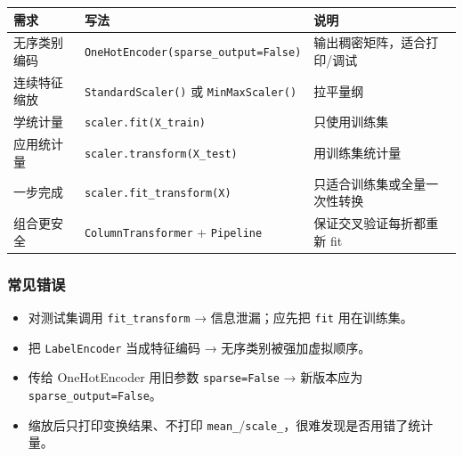 {\def\LTcaptype{none} %
\begin{longtable}[]{@{}
  >{\raggedright\arraybackslash}p{}
  >{\raggedright\arraybackslash}p{}
  >{\raggedright\arraybackslash}p{}@{}}
\toprule\noalign{}
\begin{minipage}[b]{\linewidth}\raggedright
需求
\end{minipage} & \begin{minipage}[b]{\linewidth}\raggedright
写法
\end{minipage} & \begin{minipage}[b]{\linewidth}\raggedright
说明
\end{minipage} \\
\midrule\noalign{}
\endhead
\bottomrule\noalign{}
\endlastfoot
无序类别编码 & \texttt{OneHotEncoder(sparse\_output=False)} &
输出稠密矩阵，适合打印/调试 \\
连续特征缩放 & \texttt{StandardScaler()} 或 \texttt{MinMaxScaler()} &
拉平量纲 \\
学统计量 & \texttt{scaler.fit(X\_train)} & 只使用训练集 \\
应用统计量 & \texttt{scaler.transform(X\_test)} & 用训练集统计量 \\
一步完成 & \texttt{scaler.fit\_transform(X)} &
只适合训练集或全量一次性转换 \\
组合更安全 & \texttt{ColumnTransformer} + \texttt{Pipeline} &
保证交叉验证每折都重新 fit \\
\end{longtable}
}

\subsubsection{常见错误}\label{ux5e38ux89c1ux9519ux8bef-31}

\begin{itemize}
\tightlist
\item
  对测试集调用 \texttt{fit\_transform} → 信息泄漏；应先把 \texttt{fit}
  用在训练集。
\item
  把 \texttt{LabelEncoder} 当成特征编码 → 无序类别被强加虚拟顺序。
\item
  传给 OneHotEncoder 用旧参数 \texttt{sparse=False} → 新版本应为
  \texttt{sparse\_output=False}。
\item
  缩放后只打印变换结果、不打印
  \texttt{mean\_}/\texttt{scale\_}，很难发现是否用错了统计量。
\end{itemize}

